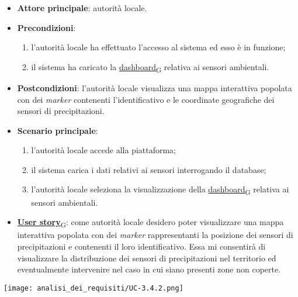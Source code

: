 \begin{itemize}
	\item \textbf{Attore principale}: autorità locale.
	\item \textbf{Precondizioni}:
	      \begin{enumerate}
		      \item l'autorità locale ha effettuato l'accesso al sistema ed esso è in funzione;
		      \item il sistema ha caricato la \href{https://7last.github.io/docs/pb/documentazione-interna/glossario\#dashboard}{dashboard\textsubscript{G}} relativa ai sensori ambientali.
	      \end{enumerate}
	\item \textbf{Postcondizioni}: l'autorità locale visualizza una mappa interattiva popolata con dei \textit{marker} contenenti l'identificativo e le coordinate geografiche dei sensori di precipitazioni.
	\item \textbf{Scenario principale}:
	      \begin{enumerate}
		      \item l'autorità locale accede alla piattaforma;
		      \item il sistema carica i dati relativi ai sensori interrogando il database;
		      \item l'autorità locale seleziona la visualizzazione della \href{https://7last.github.io/docs/pb/documentazione-interna/glossario\#dashboard}{dashboard\textsubscript{G}} relativa ai sensori ambientali.
	      \end{enumerate}
	\item \href{https://7last.github.io/docs/pb/documentazione-interna/glossario\#user-story}{\textbf{User story}\textsubscript{G}}:
	      come autorità locale desidero poter visualizzare una mappa interattiva popolata con dei \textit{marker} rappresentanti la posizione dei sensori di precipitazioni
	      e contenenti il loro identificativo. Essa mi consentirà di visualizzare la distribuzione dei sensori di precipitazioni nel territorio ed
	      eventualmente intervenire nel caso in cui siano presenti zone non coperte.
\end{itemize}
\begin{center}
	\texttt{[image: analisi\_dei\_requisiti/UC-3.4.2.png]}
\end{center}



